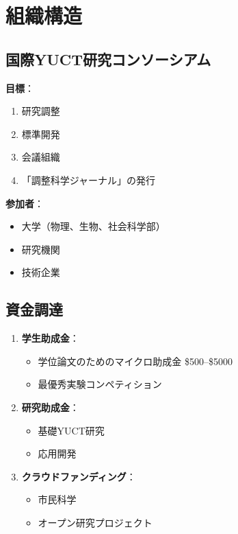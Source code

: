 \documentclass[12pt,a4paper]{article}
\begin{document}
	\section{組織構造}
	
	\subsection{国際YUCT研究コンソーシアム}
	
	\textbf{目標}：
	\begin{enumerate}
		\item 研究調整
		\item 標準開発
		\item 会議組織
		\item 「調整科学ジャーナル」の発行
	\end{enumerate}
	
	\textbf{参加者}：
	\begin{itemize}
		\item 大学（物理、生物、社会科学部）
		\item 研究機関
		\item 技術企業
	\end{itemize}
	
	\subsection{資金調達}
	
	\begin{enumerate}
		\item \textbf{学生助成金}：
		\begin{itemize}
			\item 学位論文のためのマイクロ助成金 \$500–\$5000
			\item 最優秀実験コンペティション
		\end{itemize}
		
		\item \textbf{研究助成金}：
		\begin{itemize}
			\item 基礎YUCT研究
			\item 応用開発
		\end{itemize}
		
		\item \textbf{クラウドファンディング}：
		\begin{itemize}
			\item 市民科学
			\item オープン研究プロジェクト
		\end{itemize}
	\end{enumerate}
	
\end{document}
